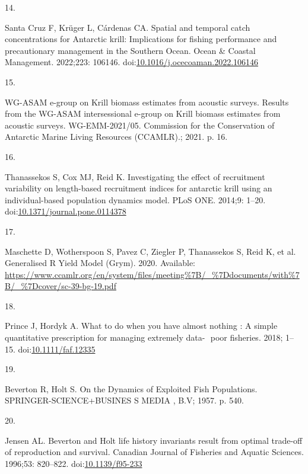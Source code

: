 \documentclass[
]{article}
\newlength{\cslhangindent}
\newlength{\csllabelwidth}
\newlength{\cslentryspacingunit} %
\newenvironment{CSLReferences}[2] %
 {%
  \setlength{\parindent}{0pt}
  \ifodd #1
  \let\oldpar\par
  \def\par{\hangindent=\cslhangindent\oldpar}
  \fi
  \setlength{\parskip}{#2\cslentryspacingunit}
 }%
 {}
\newcommand{\CSLLeftMargin}[1]{\parbox[t]{\csllabelwidth}{#1}}
\newcommand{\CSLRightInline}[1]{\parbox[t]{\linewidth - \csllabelwidth}{#1}\break}
\begin{document}
\begin{CSLReferences}{0}{0}
\leavevmode{}%
\CSLLeftMargin{14. }%
\CSLRightInline{Santa Cruz F, Krüger L, Cárdenas CA. {Spatial and
temporal catch concentrations for Antarctic krill: Implications for
fishing performance and precautionary management in the Southern Ocean}.
Ocean {\&} Coastal Management. 2022;223: 106146.
doi:\href{https://doi.org/10.1016/j.ocecoaman.2022.106146}{10.1016/j.ocecoaman.2022.106146}}

\leavevmode{}%
\CSLLeftMargin{15. }%
\CSLRightInline{WG-ASAM e-group on Krill biomass estimates from acoustic
surveys. {Results from the WG-ASAM intersessional e-group on Krill
biomass estimates from acoustic surveys. WG-EMM-2021/05}. Commission for
the Conservation of Antarctic Marine Living Resources (CCAMLR).; 2021.
p. 16. }

\leavevmode{}%
\CSLLeftMargin{16. }%
\CSLRightInline{Thanassekos S, Cox MJ, Reid K. {Investigating the effect
of recruitment variability on length-based recruitment indices for
antarctic krill using an individual-based population dynamics model}.
PLoS ONE. 2014;9: 1--20.
doi:\href{https://doi.org/10.1371/journal.pone.0114378}{10.1371/journal.pone.0114378}}

\leavevmode{}%
\CSLLeftMargin{17. }%
\CSLRightInline{Maschette D, Wotherspoon S, Pavez C, Ziegler P,
Thanassekos S, Reid K, et al. {Generalised R Yield Model (Grym)}. 2020.
Available:
\url{https://www.ccamlr.org/en/system/files/meeting\%7B/_\%7Ddocuments/with\%7B/_\%7Dcover/sc-39-bg-19.pdf}}

\leavevmode{}%
\CSLLeftMargin{18. }%
\CSLRightInline{Prince J, Hordyk A. {What to do when you have almost
nothing : A simple quantitative prescription for managing extremely
data- ­ poor fisheries}. 2018; 1--15.
doi:\href{https://doi.org/10.1111/faf.12335}{10.1111/faf.12335}}

\leavevmode{}%
\CSLLeftMargin{19. }%
\CSLRightInline{Beverton R, Holt S. {On the Dynamics of Exploited Fish
Populations}. SPRINGER-SCIENCE+BUSINES S MEDIA , B.V; 1957. p. 540. }

\leavevmode{}%
\CSLLeftMargin{20. }%
\CSLRightInline{Jensen AL. {Beverton and Holt life history invariants
result from optimal trade-off of reproduction and survival}. Canadian
Journal of Fisheries and Aquatic Sciences. 1996;53: 820--822.
doi:\href{https://doi.org/10.1139/f95-233}{10.1139/f95-233}}


\end{CSLReferences}
\end{document}
